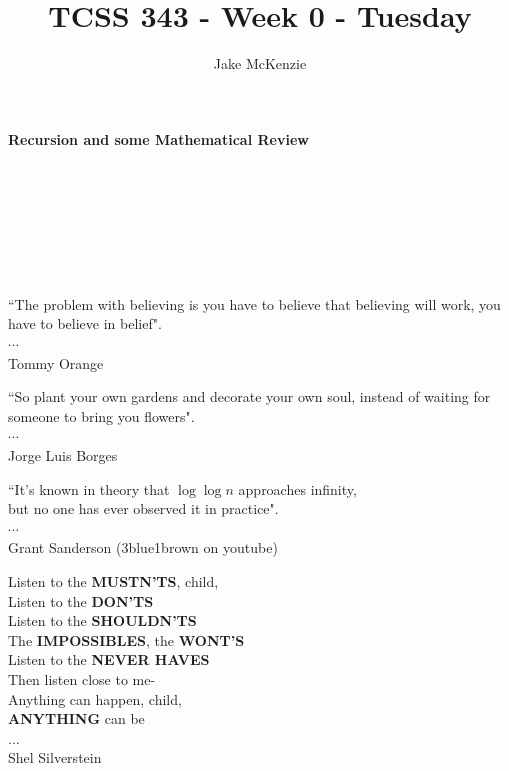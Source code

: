 \documentclass[12pt]{article}
\begin{document}
\title{TCSS 343 - Week 0 - Tuesday}
\author{Jake McKenzie}
\maketitle
\noindent\centerline{\textbf{Recursion and some Mathematical Review}}\\\\\\\\\\\\
\begin{center}
    ``The problem with believing is you have to believe that believing will work, you have to believe in belief". \\$\cdots$\\ Tommy Orange
\end{center}
\begin{center}
    ``So plant your own gardens and decorate your own soul, instead of waiting for someone to bring you flowers". \\$\cdots$\\ Jorge Luis Borges
\end{center}
\begin{center}
    ``It's known in theory that $\log{\log{n}}$ approaches infinity, \\but no one has ever observed it in practice". \\$\cdots$\\ Grant Sanderson (3blue1brown on youtube)
\end{center}
\begin{center}
Listen to the \textbf{MUSTN'TS}, child,\\
Listen to the \textbf{DON'TS}\\
Listen to the \textbf{SHOULDN'TS}\\
The \textbf{IMPOSSIBLES}, the \textbf{WONT'S}\\
Listen to the \textbf{NEVER HAVES}\\
Then listen close to me-\\
Anything can happen, child,\\
\textbf{ANYTHING} can be\\ 
$\dots$\\
Shel Silverstein 
\end{center}
\newpage
\end{document}
